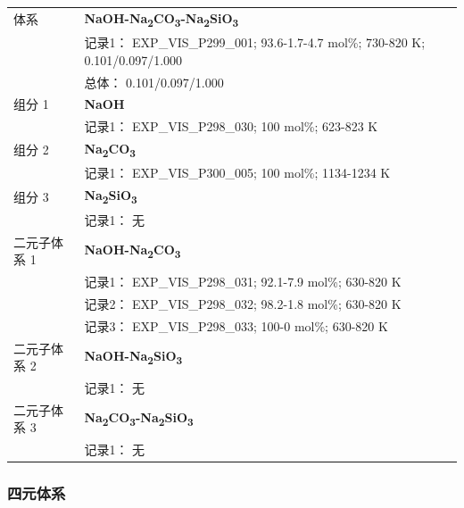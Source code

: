 \documentclass[12pt]{article}
\begin{document}
{\begin{longtable}[]{@{}
  >{\raggedright\arraybackslash}p{}
  >{\raggedright\arraybackslash}p{}@{}}
\midrule
体系 & \textbf{NaOH-Na\textsubscript{2}CO\textsubscript{3}-Na\textsubscript{2}SiO\textsubscript{3}} \\
 & 记录1： EXP\_VIS\_P299\_001; 93.6-1.7-4.7 mol\%; 730-820 K; 0.101/0.097/1.000 \\
 & 总体： 0.101/0.097/1.000  \\

组分 1  & \textbf{NaOH} \\
 & 记录1： EXP\_VIS\_P298\_030; 100 mol\%; 623-823 K  \\

组分 2  & \textbf{Na\textsubscript{2}CO\textsubscript{3}} \\
 & 记录1： EXP\_VIS\_P300\_005; 100 mol\%; 1134-1234 K  \\

组分 3 & \textbf{Na\textsubscript{2}SiO\textsubscript{3}} \\
 & 记录1： 无 \\
二元子体系 1  & \textbf{NaOH-Na\textsubscript{2}CO\textsubscript{3}} \\
 & 记录1： EXP\_VIS\_P298\_031; 92.1-7.9 mol\%; 630-820 K \\
 & 记录2： EXP\_VIS\_P298\_032; 98.2-1.8 mol\%; 630-820 K \\
 & 记录3： EXP\_VIS\_P298\_033; 100-0 mol\%; 630-820 K  \\

二元子体系 2 & \textbf{NaOH-Na\textsubscript{2}SiO\textsubscript{3}} \\
 & 记录1： 无 \\
二元子体系 3 & \textbf{Na\textsubscript{2}CO\textsubscript{3}-Na\textsubscript{2}SiO\textsubscript{3}} \\
 & 记录1： 无 \\
\end{longtable}
}

\subsubsection*{四元体系}\label{quaternary-system-4}
\end{document}
